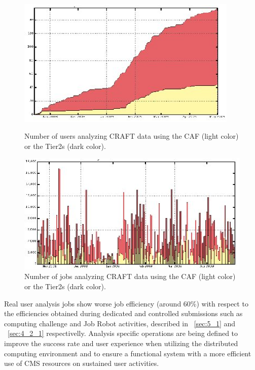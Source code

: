 %
\begin{figure}
\begin{minipage}{.48\textwidth}
\centering
\includegraphics[width=0.94\textwidth]{CRAFTusers.eps}
\caption{Number of users analyzing CRAFT data using the CAF (light color) or the Tier2s (dark color).}
\label{fig:CRAFTusers}
\end{minipage}
\begin{minipage}{.48\textwidth}
\centering
\includegraphics[width=1.06\textwidth]{CRAFTjobs.eps}
\caption{Number of jobs analyzing CRAFT data using the CAF (light color) or the Tier2s (dark color).}
\label{fig:CRAFTjobs}
\end{minipage}
\end{figure}


Real user analysis jobs show worse job efficiency (around 60\%) with respect to the efficiencies obtained during dedicated and controlled submissions such 
as computing challenge and Job Robot activities, described in ~\ref{sec:5_1} and ~\ref{sec:4_2_1} respectivelly.
Analysis specific operations are being defined to improve the success rate and user experience when utilizing the distributed computing environment and to ensure a functional system with a more efficient use of CMS resources on sustained user activities.

